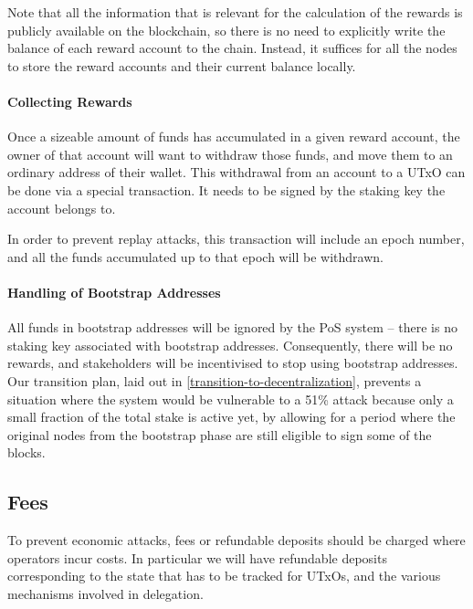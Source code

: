 \documentclass[11pt,a4paper]{article}
\begin{document}
Note that all the information that is relevant for the calculation of
the rewards is publicly available on the blockchain, so there is no
need to explicitly write the balance of each reward account to the
chain. Instead, it suffices for all the nodes to store the reward
accounts and their current balance locally.

\paragraph{Collecting Rewards}

Once a sizeable amount of funds has accumulated in a given reward
account, the owner of that account will want to withdraw those funds,
and move them to an ordinary address of their wallet. This withdrawal
from an account to a UTxO can be done via a special transaction. It
needs to be signed by the staking key the account belongs to.

In order to prevent replay attacks, this transaction will include an
epoch number, and all the funds accumulated up to that epoch will be
withdrawn.

\paragraph{Handling of Bootstrap Addresses}
\label{handling-of-bootstrap-addresses}

All funds in bootstrap addresses will be ignored by the PoS system --
there is no staking key associated with bootstrap
addresses. Consequently, there will be no rewards, and stakeholders
will be incentivised to stop using bootstrap addresses. Our transition
plan, laid out in \cref{transition-to-decentralization}, prevents a
situation where the system would be vulnerable to a 51\% attack
because only a small fraction of the total stake is active yet, by
allowing for a period where the original nodes from the bootstrap
phase are still eligible to sign some of the blocks.

\subsection{Fees}
\label{fees}

To prevent economic attacks, fees or refundable deposits should be
charged where operators incur costs. In particular we will have
refundable deposits corresponding to the state that has to be tracked
for UTxOs, and the various mechanisms involved in delegation.
\end{document}
